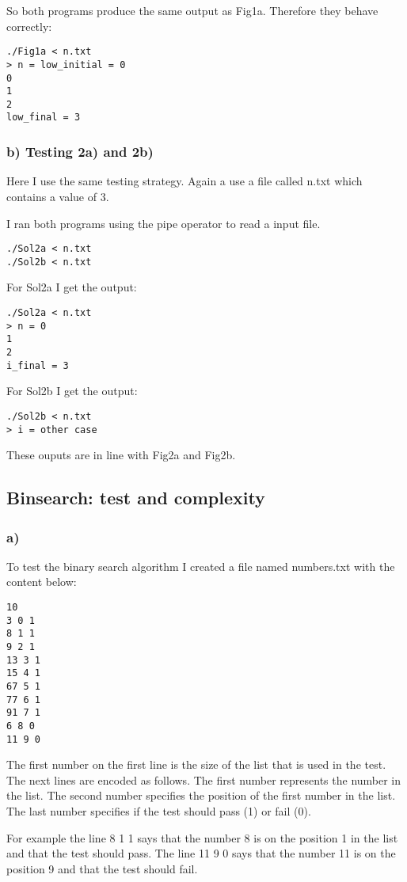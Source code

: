 \documentclass[12pt]{article}
\begin{document}
So both programs produce the same output as Fig1a. Therefore they behave correctly:
\begin{lstlisting}
./Fig1a < n.txt 
> n = low_initial = 0
0
1
2
low_final = 3
\end{lstlisting}

\subsubsection*{b) Testing 2a) and 2b)}
Here I use the same testing strategy. Again a use a file called n.txt which contains a value of 3.

I ran both programs using the pipe operator to read a input file.
\begin{lstlisting}
./Sol2a < n.txt
./Sol2b < n.txt
\end{lstlisting}

For Sol2a I get the output:
\begin{lstlisting}
./Sol2a < n.txt 
> n = 0
1
2
i_final = 3
\end{lstlisting}

For Sol2b I get the output:
\begin{lstlisting}
./Sol2b < n.txt 
> i = other case
\end{lstlisting}

These ouputs are in line with Fig2a and Fig2b.

\subsection*{Binsearch: test and complexity}
\subsubsection*{a)}
To test the binary search algorithm I created a file named numbers.txt with the content below:
\begin{lstlisting}
10
3 0 1
8 1 1
9 2 1
13 3 1
15 4 1
67 5 1
77 6 1
91 7 1
6 8 0
11 9 0
\end{lstlisting}
The first number on the first line is the size of the list that is used in the test. The next lines are encoded as follows. The first number represents the number in the list. The second number specifies the position of the first number in the list. The last number specifies if the test should pass (1) or fail (0).

For example the line 8 1 1 says that the number 8 is on the position 1 in the list and that the test should pass. The line 11 9 0 says that the number 11 is on the position 9 and that the test should fail.
\end{document}
